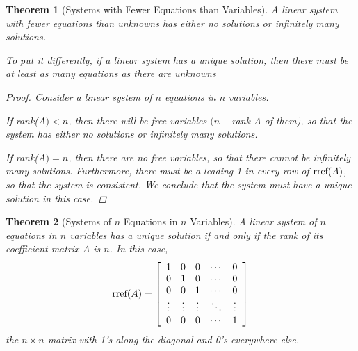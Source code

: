 \documentclass[10pt]{report}
\newtheorem{thm2}{Theorem}[section]
\newcommand{\rref}{\textup{rref}}
\begin{document}
\begin{thm2}[Systems with Fewer Equations than Variables]
A linear system with fewer equations than unknowns has either no solutions or infinitely many solutions.

To put it differently, if a linear system has a unique solution, then there must be at least as many equations as there are unknowns
\begin{proof}
Consider a linear system of $n$ equations in $n$ variables. 

If rank($A)<n$, then there will be free variables $(n - $rank $A$ of them), so that the system has either no solutions or infinitely many solutions.

If rank($A)=n$, then there are no free variables, so that there cannot be infinitely many solutions. Furthermore, there must be a leading 1 in every row of $\rref(A)$, so that the system is consistent. We conclude that the system must have a unique solution in this case.
\end{proof}
\end{thm2}
\begin{thm2}[Systems of $n$ Equations in $n$ Variables]
A linear system of $n$ equations in $n$ variables has a unique solution if and only if the rank of its coefficient matrix $A$ is $n$. In this case,
$$\rref(A)=\left[\begin{array}{c c c c c}
1 & 0 & 0 & \cdots & 0\\
0 & 1 & 0 & \cdots & 0\\
0 & 0 & 1 & \cdots & 0\\
\vdots & \vdots & \vdots & \ddots & \vdots\\
0 & 0 & 0 & \cdots & 1\\

\end{array}\right]$$
the $n\times n$ matrix with 1's along the diagonal and 0's everywhere else.
\end{thm2}
\end{document}
